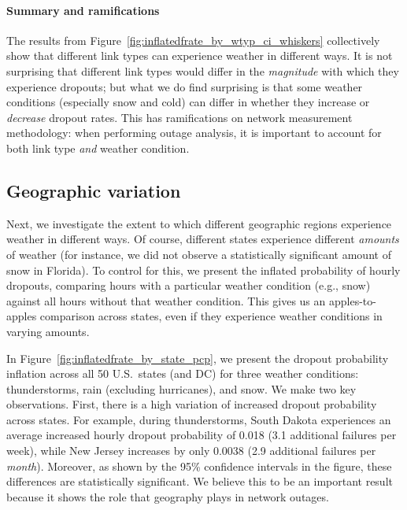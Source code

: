 \paragraph{Summary and ramifications}
%
The results from Figure~\ref{fig:inflatedfrate_by_wtyp_ci_whiskers}
collectively show that different link types can experience weather in
different ways.
%
It is not surprising that different link types would differ in the
\emph{magnitude} with which they experience dropouts; but what we do
find surprising is that some weather conditions (especially snow and
cold) can differ in whether they increase or \emph{decrease} dropout
rates.
%
This has ramifications on network measurement methodology: when
performing outage analysis, it is important to account for both link
type \emph{and} weather condition.
%





\subsection{Geographic variation} %
\label{sec:geography}

Next, we investigate the extent to which different geographic regions
experience weather in different ways.
%
Of course, different states experience different \emph{amounts} of
weather (for instance, we did not observe a statistically significant
amount of snow in Florida).
%
To control for this, we present the inflated probability of hourly
dropouts, comparing hours with a particular weather condition (e.g.,
snow) against all hours without that weather condition.
%
This gives us an apples-to-apples comparison across states, even if
they experience weather conditions in varying amounts.

In Figure~\ref{fig:inflatedfrate_by_state_pcp}, we present the dropout
probability inflation across all 50 U.S.~states (and DC) for three weather
conditions: thunderstorms, rain (excluding hurricanes), and snow.
%
We make two key observations.
%
First, there is a high variation of increased dropout probability across states.
%
For example, during thunderstorms, South Dakota experiences an average
increased hourly dropout probability of 0.018 (3.1 additional
failures per week), while New Jersey increases by only 0.0038 (2.9
additional failures per \emph{month}).
%
Moreover, as shown by the 95\% confidence intervals in the figure,
these differences are statistically significant.
%
We believe this to be an important result because it shows
the role that geography plays in network outages. 


